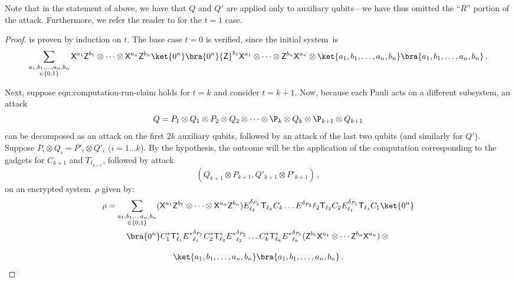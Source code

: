 \documentclass{toc}
\newcommand{\tgate}{{\sf T}}
\newcommand{\xgate}{{\sf X}}
\newcommand{\zgate}{{\sf Z}}
\newcommand{\ketbra}[2]{\ket{#1}\bra{#2}}			%
\newcommand{\egoketbra}[1]{\ketbra{#1}{#1}}			%
\begin{document}
Note that in the statement of  above, we have that $Q$ and $Q'$ are applied only to auxiliary qubits---we have thus omitted the ``$R$'' portion of the attack. %
%
 Furthermore, we refer the reader to  for the $t=1$ case.

\begin{proof}
 is proven by induction on $t$. The base case $t=0$ is verified, since the initial system~is%
\begin{equation}
\sum_{\substack{a_1,b_1, \ldots ,a_n, b_n \\ \in \{0,1\}}}  \xgate^{a_1}\zgate^{b_1} \otimes \cdots \otimes \xgate^{a_n}\zgate^{b_n} \egoketbra{0^n}  \zgate^{b_1} \xgate^{a_1}\otimes \cdots \otimes \zgate^{b_n} \xgate^{a_n} \otimes \egoketbra{a_1, b_1, \ldots ,a_n, b_n}\,.
\end{equation}

Next, suppose  {eqn:computation-run-claim} holds for $t=k$ and consider $t=k+1$.
Now, because each Pauli acts on a different subsystem,  an attack
\begin{equation}
  Q=P_1\otimes Q_1 \otimes P_2 \otimes Q_2 \otimes \cdots \otimes \P_k \otimes Q_k \otimes \P_{k+1} \otimes Q_{k+1}
\end{equation}
can be decomposed as an attack on the first $2k$ auxiliary qubits,
followed by an attack of the last two qubits (and similarly for
$Q'$). Suppose $P_i \otimes Q_i = P'_i \otimes Q'_i$ $(i=1\ldots
k$). By the hypothesis, the outcome will be the application of the
computation corresponding to the gadgets for $C_{k+1}$ and
$T_{\ell_{k+1}}$, followed by attack
\begin{equation}
  (Q_{k+1} \otimes P_{k+1}, Q'_{k+1} \otimes P'_{k+1})\,,
\end{equation}
on an encrypted system~$\rho$ given by:
\begin{multline}
\rho = \sum_{\substack{a_1,b_1, \ldots a_n, b_n \\ \in \{0,1\}}} (\xgate^{a_1}\zgate^{b_1} \otimes \cdots \otimes \xgate^{a_n}\zgate^{b_n})  E^{\delta_{P_k}}_{\ell_k}    \tgate_{\ell_k} C_k \ldots  E^{\delta_{P_2}}{\ell_2}    \tgate_{\ell_2} C_2  E^{\delta_{P_1}}_{\ell_1}  \tgate_{\ell_1} C_1 \ket{0^n}\\
 \bra{0^n} C_1^* \tgate^*_{\ell_1}   {E^*}^{\delta_{P_1}}_{\ell_1} C_2^*   \tgate^*_{\ell_2}   {E^*}^{\delta_{P_2}}_{\ell_2} \ldots   C_k^* \tgate^*_{\ell_k}   {E^*}^{\delta_{P_t}}_{\ell_k}  (\zgate^{b_1} \xgate^{a_1}\otimes \cdots \zgate^{b_n} \xgate^{a_n})
 \otimes {}\\[2ex] \egoketbra{a_1, b_1, \ldots ,a_n, b_n}\,.
\end{multline}


\end{proof}
\end{document}
